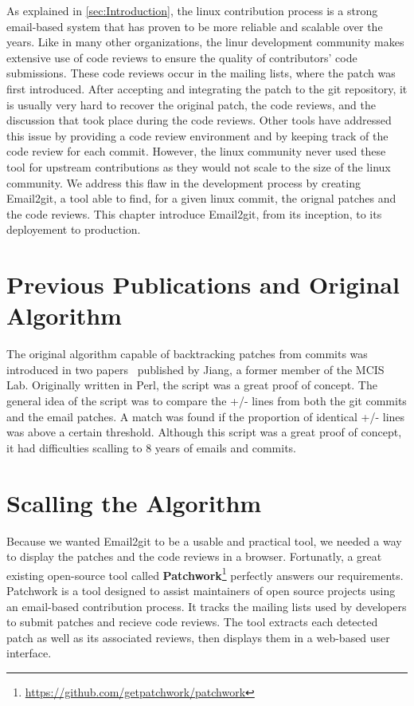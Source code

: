 \label{sec:Theme2}

As explained in \autoref{sec:Introduction}, the linux contribution process is a strong email-based system that has proven to be more reliable and scalable over the years. Like in many other organizations, the linur development community makes extensive use of code reviews to ensure the quality of contributors' code submissions. These code reviews occur in the mailing lists, where the patch was first introduced. After accepting and integrating the patch to the git repository, it is usually very hard to recover the original patch, the code reviews, and the discussion that took place during the code reviews. Other tools have addressed this issue by providing a code review environment and by keeping track of the code review for each commit.  However, the linux community never used these tool for upstream contributions as they would not scale to the size of the linux community. We address this flaw in the development process by creating Email2git, a tool able to find, for a given linux commit, the orignal patches and the code reviews. This chapter introduce Email2git, from its inception, to its deployement to production. 

\section{Previous Publications and Original Algorithm}

The original algorithm capable of backtracking patches from commits was introduced in two papers~\citep{msr13jojo,jiang14} published by Jiang, a former member of the MCIS Lab. Originally written in Perl, the script was a great proof of concept. The general idea of the script was to compare the +/- lines from both the git commits and the email patches. A match was found if the proportion of identical +/- lines was above a certain threshold. Although this script was a great proof of concept, it had difficulties scalling to 8 years of emails and commits. 



\section{Scalling the Algorithm}

Because we wanted Email2git to be a usable and practical tool, we needed a way to display the patches and the code reviews in a browser. Fortunatly, a great existing open-source tool called \textbf{Patchwork}\footnote{\url{https://github.com/getpatchwork/patchwork}} perfectly answers our requirements. Patchwork is a tool designed to assist maintainers of open source projects using an email-based contribution process. It tracks the mailing lists used by developers to submit patches and recieve code reviews. The tool extracts each detected patch as well as its associated reviews, then displays them in a web-based user interface. 

